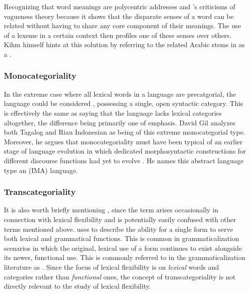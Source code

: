 
Recognizing that word meanings are polycentric addresses \citeauthor{EvansOsada2005} and \citeauthor{Kihm2017}'s criticisms of vagueness theory because it shows that the disparate senses of a word can be related without having to share any core component of their meanings. The use of a lexeme in a certain context then profiles one of these senses over others. Kihm himself hints at this solution by referring to the related Arabic stems in  as a .

\subsubsection{Monocategoriality}
\label{sec:2.3.1.5}

In the extreme case where all lexical words in a language are precatgorial, the language could be considered , possessing a single, open syntactic category. This is effectively the same as saying that the language lacks lexical categories altogether, the difference being primarily one of emphasis. David Gil analyzes both Tagalog \parencites*{Gil1993}{Gil1995} and Riau Indonesian \parencite*{Gil1994} as being of this extreme monocategorial type. Moreover, he argues that monocategoriality must have been typical of an earlier stage of language evolution in which dedicated morphosyntactic constructions for different discourse functions had yet to evolve \parencites{Gil2005a}{Gil2005}{Gil2012}. He names this abstract language type an  (IMA) language.

\subsubsection{Transcategoriality}
\label{sec:2.3.1.6}

It is also worth briefly mentioning , since the term arises occasionally in connection with lexical flexibility and is potentially easily confused with other terms mentioned above. \textcite{Robert2003} uses  to describe the ability for a single form to serve both lexical and grammatical functions. This is common in grammaticalization scenarios in which the original, lexical use of a form continues to exist alongside its newer, functional use. This is commonly referred to in the grammaticalization literature as . Since the focus of lexical flexibility is on \emph{lexical} words and categories rather than \emph{functional} ones, the concept of transcategoriality is not directly relevant to the study of lexical flexibility.

